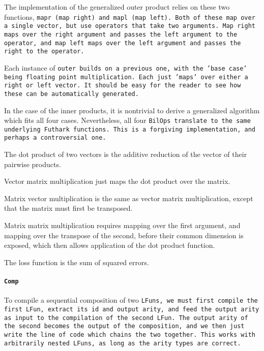The implementation of the generalized outer product relies on these two
functions, \tt{mapr} (map right) and \tt{mapl} (map left). Both of these
map over a single vector, but use operators that take two arguments. Map
right maps over the right argument and passes the left argument to the
operator, and map left maps over the left argument and passes the right
to the operator.

Each instance of \tt{outer} builds on a previous one, with the 'base case'
being floating point multiplication. Each just 'maps' over either a right
or left vector. It should be easy for the reader to see how these can be
automatically generated.

In the case of the inner products, it is nontrivial to derive a generalized
algorithm which fits all four cases. Nevertheless, all four \tt{BilOp}s
translate to the same underlying Futhark functions. This is a forgiving
implementation, and perhaps a controversial one.

The dot product of two vectors is the additive reduction of the vector of
their pairwise products.

Vector matrix multiplication just maps the dot product over the matrix.

Matrix vector multiplication is the same as vector matrix multiplication,
except that the matrix must first be transposed.

Matrix matrix multiplication requires mapping over the first argument, and
mapping over the transpose of the second, before their common dimension is
exposed, which then allows application of the dot product function.


The loss function is the sum of squared errors.

\paragraph{\tt{Comp}}


To compile a sequential composition of two \tt{LFun}s, we must first compile
the first \tt{LFun}, extract its id and output arity, and feed the output
arity as input to the compilation of the second \tt{LFun}. The output arity
of the second becomes the output of the composition, and we then just write
the line of code which chains the two together. This works with arbitrarily
nested \tt{LFun}s, as long as the arity types are correct.

